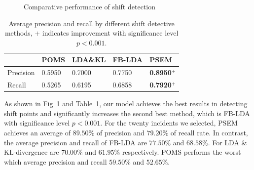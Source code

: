 \documentclass[runningheads]{llncs}
\begin{document}
\begin{figure}
\centering
{}
\hspace{-4ex}
\setlength{\abovecaptionskip}{-0.1cm}
\caption{Comparative performance of shift detection}\label{fig:boxshift}
\end{figure}

\renewcommand\arraystretch{1.5}
\begin{table}[]
\begin{center}
\caption{Average precision and recall by different shift detective methods, $+$ indicates improvement with significance level $p<0.001$.}\label{table:pr}
\begin{tabular}{p{2cm}<{\centering}p{2cm}<{\centering}p{2cm}<{\centering}p{2cm}<{\centering}p{2cm}<{\centering}}
\hline
          & POMS   & LDA\&KL & FB-LDA & PSEM   \\ \hline
Precision & 0.5950 & 0.7000  & 0.7750 & \textbf{0.8950$^+$} \\ \hline
Recall    & 0.5265 & 0.6195  & 0.6858 & \textbf{0.7920$^+$} \\ \hline
\end{tabular}
\end{center}
\end{table}

As shown in  Fig~\ref{fig:boxshift} and Table~\ref{table:pr}, our model achieves the best results in detecting shift points and significantly increases the second best method, which is FB-LDA with significance level $p<0.001$. For the twenty incidents we selected, PSEM achieves an average of $89.50\%$ of precision and $79.20\%$ of recall rate. In contrast, the average precision and recall of FB-LDA are $77.50\%$ and $68.58\%$. For LDA \& KL-divergence are $70.00\%$ and $61.95\%$ respectively. POMS performs the worst which average precision and recall  $59.50\%$ and $52.65\%$. %
\end{document}
